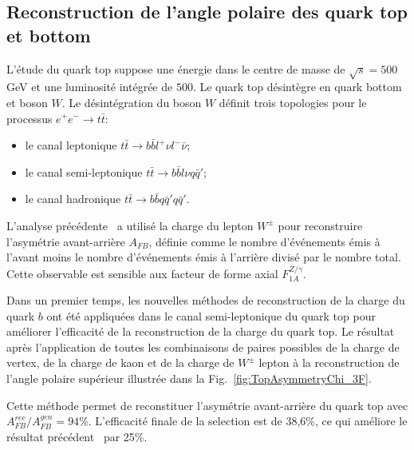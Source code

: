 \newpage
\subsection*{Reconstruction de l'angle polaire des quark top et bottom}
L’\'etude du quark top suppose une \'energie dans le centre de masse de $\sqrt{s} = 500$\,GeV et une luminosit\'e int\'egr\'ee de $500$\ifb. 
Le quark top désintègre en quark bottom et boson $W$. Le désint\'egration du boson $W$ définit trois topologies pour le processus $e^+e^-\to t\bar{t}$:
\begin{itemize}
	\item le canal leptonique $ t\bar{t} \to b\bar{b} l^+ \nu l^- \bar{\nu}$;
	\item le canal semi-leptonique $ t\bar{t} \to b\bar{b} l \nu q \bar{q}'$;
	\item le canal hadronique $ t\bar{t} \to b\bar{b} q \bar{q}' q \bar{q}'$.
\end{itemize}
 L'analyse précédente~\cite{bib:ILCTOP} a utilisé la charge du lepton $W^\pm$ pour reconstruire  l'asymétrie avant-arrière $A_ {FB}$, définie comme le nombre d'événements émis à l'avant moins le nombre d'événements émis à l'arrière divisé par le nombre total.
Cette observable est sensible aux facteur de forme axial $F_{1A}^{Z/\gamma}$.


Dans un premier temps, les nouvelles méthodes de reconstruction de la charge du quark $b$ ont été appliquées dans le canal semi-leptonique du quark top pour améliorer l'efficacit\'e de la reconstruction de la charge du quark top.
Le résultat après l'application de toutes les combinaisons de paires possibles de la charge de vertex, de la charge de kaon et de la charge de $W^\pm$ lepton à la reconstruction de l'angle polaire supérieur illustrée dans la Fig.~\ref {fig:TopAsymmetryChi_3F}.

Cette méthode permet de reconstituer l'asymétrie avant-arrière du quark top avec $A_ {FB}^{rec} / A^{gen}_{FB} = 94\%$. L'efficacité finale de la selection est de 38,6\%, ce qui améliore le résultat précédent~\cite{bib:ILCTOP} par 25\%.

